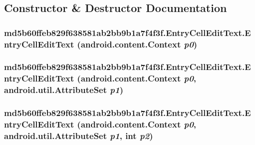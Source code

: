 \subsection{Constructor \& Destructor Documentation}
\hypertarget{classmd5b60ffeb829f638581ab2bb9b1a7f4f3f_1_1_entry_cell_edit_text_1f812c4dd4a8466916a56cd524846c26}{
\subsubsection[{EntryCellEditText}]{\setlength{\rightskip}{0pt plus 5cm}md5b60ffeb829f638581ab2bb9b1a7f4f3f.EntryCellEditText.EntryCellEditText (android.content.Context {\em p0})}}
\label{classmd5b60ffeb829f638581ab2bb9b1a7f4f3f_1_1_entry_cell_edit_text_1f812c4dd4a8466916a56cd524846c26}


\hypertarget{classmd5b60ffeb829f638581ab2bb9b1a7f4f3f_1_1_entry_cell_edit_text_1534671bdcadb40b84028d5077f27748}{
\subsubsection[{EntryCellEditText}]{\setlength{\rightskip}{0pt plus 5cm}md5b60ffeb829f638581ab2bb9b1a7f4f3f.EntryCellEditText.EntryCellEditText (android.content.Context {\em p0}, \/  android.util.AttributeSet {\em p1})}}
\label{classmd5b60ffeb829f638581ab2bb9b1a7f4f3f_1_1_entry_cell_edit_text_1534671bdcadb40b84028d5077f27748}


\hypertarget{classmd5b60ffeb829f638581ab2bb9b1a7f4f3f_1_1_entry_cell_edit_text_d9ec4d4eb1721ae9dacee80558ac74bb}{
\subsubsection[{EntryCellEditText}]{\setlength{\rightskip}{0pt plus 5cm}md5b60ffeb829f638581ab2bb9b1a7f4f3f.EntryCellEditText.EntryCellEditText (android.content.Context {\em p0}, \/  android.util.AttributeSet {\em p1}, \/  int {\em p2})}}
\label{classmd5b60ffeb829f638581ab2bb9b1a7f4f3f_1_1_entry_cell_edit_text_d9ec4d4eb1721ae9dacee80558ac74bb}


